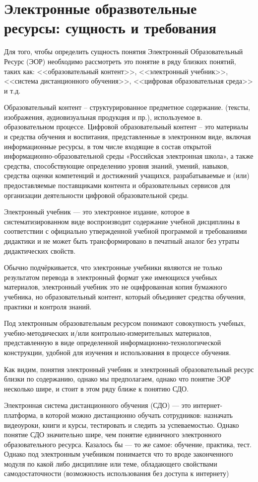 \newpage
\large
\section {Электронные образвотельные ресурсы: сущность и требования}
Для того, чтобы определить сущность понятия Электронный Образовательный Ресурс (ЭОР) необходимо рассмотреть это понятие в ряду близких понятий, таких как: <<образовательный контент>>, <<электронный учебник>>, <<система дистанционного обучения>>, <<цифровая образовательная среда>> и т.д.

Образовательный контент – структурированное предметное содержание. (тексты, изображения, аудиовизуальная продукция и пр.), используемое в. образовательном процессе. 
Цифровой образовательный контент – это материалы и средства обучения и воспитания, представленные в электронном виде, включая информационные ресурсы, в том числе входящие в состав открытой информационно-образовательной среды «Российская электронная школа», а также средства, способствующие определению уровня знаний, умений, навыков, средства оценки компетенций и достижений учащихся, разрабатываемые и (или) предоставляемые поставщиками контента и образовательных сервисов для организации деятельности цифровой образовательной среды.

Электронный учебник --- это электронное издание, которое в систематизированном виде
воспроизводит содержание учебной дисциплины в соответствии с официально утвержденной учебной программой и требованиями дидактики и не может быть трансформировано в печатный аналог без утраты дидактических свойств\cite{balalaeva}. 

Обычно подчёркивается, что электронные учебники являются не
только результатом перевода в электронный формат уже имеющихся учебных
материалов, электронный учебник это не оцифрованная копия бумажного учебника, но образовательный контент, который объединяет средства обучения, практики и контроля знаний.

Под электронным образовательным ресурсом понимают совокупность учебных, учебно-методических и/или контрольно-измерительных материалов, представленную в виде определенной информационно-технологической конструкции, удобной для изучения и
использования в процессе обучения\cite{jurkina20}.

Как видим, понятия электронный учебник и электронный образовательный ресурс близки по содержанию, однако мы предполагаем, однако что понятие ЭОР несколько шире, и стоит в этом ряду ближе к понятию СДО.

Электронная система дистанционного обучения (СДО) — это интернет-платформа, в которой можно дистанционно обучать сотрудников: назначать видеоуроки, книги и курсы, тестировать и следить за успеваемостью. Однако понятие СДО значительно шире, чем понятие единичного электронного образовательного ресурса. Казалось бы --- то же самое: обучение, практика, тест. Однако под электронным учебником понимается что то вроде законченного модуля по какой либо дисциплине или теме, обладающего свойствами самодостаточности (возможность использования без доступа к интернету)

